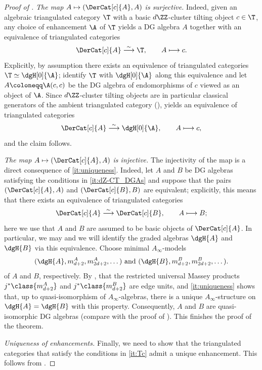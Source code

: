 \documentclass[a4paper]{amsart}
\begin{document}
\begin{proof}[Proof of ]
  \emph{The map $A\mapsto (\DerCat[c]{A},A)$ is
    surjective.} Indeed,
  given an algebraic triangulated category $\T$ with a basic $d\ZZ$-cluster
  tilting object $c\in\T$, any choice of enhancement $\A$ of $\T$ yields a DG
  algebra $A$ together with an equivalence of triangulated categories
  \[
    \DerCat[c]{A}\stackrel{\sim}{\longrightarrow}\T,\qquad A\longmapsto c.
  \]
  Explicitly, by assumption there exists an equivalence of
  triangulated categories $\T\simeq\dgH[0]{\A}$; identify $\T$ with
  $\dgH[0]{\A}$ along this equivalence and let $A\coloneqq\A(c,c)$ be the DG
  algebra of endomorphisms of $c$ viewed as an object of $\A$. Since
  $d\ZZ$-cluster tilting objects are in particular classical generators of the
  ambient triangulated category
  (),  yields an equivalence of
  triangulated categories
  \[
    \DerCat[c]{A}\stackrel{\sim}{\longrightarrow}\dgH[0]{\A},\qquad A\longmapsto c,    
  \]
  and the claim follows. 

  \emph{The map $A\mapsto (\DerCat[c]{A},A)$ is
    injective.} The injectivity of the map is a direct consequence of
  \eqref{it:uniqueness}. Indeed, let $A$ and $B$ be DG
  algebras satisfying the conditions in \eqref{it:dZ-CT_DGAs} and suppose that
  the pairs $(\DerCat[c]{A},A)$ and $(\DerCat[c]{B},B)$ are equivalent; explicitly, this means
  that there exists an equivalence of triangulated categories
  \[
    \DerCat[c]{A}\stackrel{\sim}{\longrightarrow}\DerCat[c]{B},\qquad A\longmapsto B;
  \]
  here we use that $A$ and $B$ are assumed to be basic objects of $\DerCat[c]{A}$.
  In particular, we may and we will identify the graded algebras $\dgH{A}$ and $\dgH{B}$ via
  this equivalence. Choose minimal
  $A_\infty$-models
  \[
    (\dgH{A},m_{d+2}^A,m_{2d+2}^A,\dots)\text{ and }(\dgH{B},m_{d+2}^B,m_{2d+2}^B,\dots).
  \]
  of $A$ and $B$, respectively. By , that the restricted universal Massey
  products $j^*\class{m_{d+2}^A}$ and $j^*\class{m_{d+2}^B}$ are edge units, and
  \eqref{it:uniqueness} shows that, up to
  quasi-isomorphism of $A_\infty$-algebras, there is a unique
  $A_\infty$-structure on $\dgH{A}=\dgH{B}$ with this property. Consequently,
  $A$ and $B$ are quasi-isomorphic DG algebras (compare with the proof of
  ). This finishes the proof of
  the theorem.

  \emph{Uniqueness of enhancements.} Finally, we need to show that the triangulated categories that satisfy the
  conditions in \eqref{it:Tc}
  admit a unique enhancement. This follows from .
\end{proof}
\end{document}

